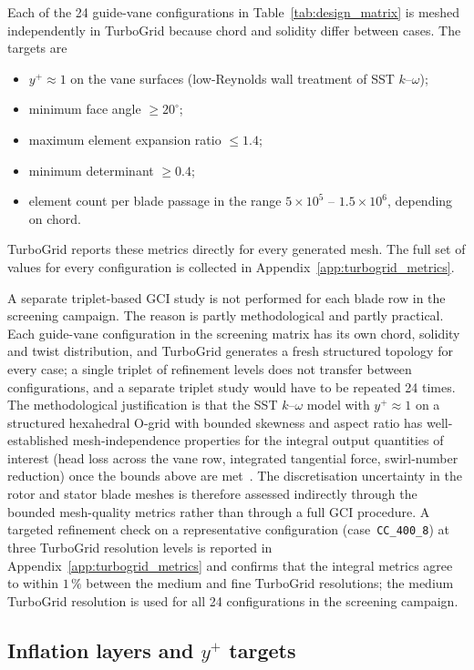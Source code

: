 Each of the 24 guide-vane configurations in Table~\ref{tab:design_matrix} is meshed independently in TurboGrid because chord and solidity differ between cases. The targets are
\begin{itemize}
  \item $y^+ \approx 1$ on the vane surfaces (low-Reynolds wall treatment of SST $k$--$\omega$);
  \item minimum face angle $\geq 20^\circ$;
  \item maximum element expansion ratio $\leq 1.4$;
  \item minimum determinant $\geq 0.4$;
  \item element count per blade passage in the range $5\times 10^5$ -- $1.5\times 10^6$, depending on chord.
\end{itemize}
TurboGrid reports these metrics directly for every generated mesh. The full set of values for every configuration is collected in Appendix~\ref{app:turbogrid_metrics}.

A separate triplet-based GCI study is not performed for each blade row in the screening campaign. The reason is partly methodological and partly practical. Each guide-vane configuration in the screening matrix has its own chord, solidity and twist distribution, and TurboGrid generates a fresh structured topology for every case; a single triplet of refinement levels does not transfer between configurations, and a separate triplet study would have to be repeated 24 times. The methodological justification is that the SST $k$--$\omega$ model with $y^+ \approx 1$ on a structured hexahedral O-grid with bounded skewness and aspect ratio has well-established mesh-independence properties for the integral output quantities of interest (head loss across the vane row, integrated tangential force, swirl-number reduction) once the bounds above are met~\cite{Menter1994}. The discretisation uncertainty in the rotor and stator blade meshes is therefore assessed indirectly through the bounded mesh-quality metrics rather than through a full GCI procedure. A targeted refinement check on a representative configuration (case~\texttt{CC\_400\_8}) at three TurboGrid resolution levels is reported in Appendix~\ref{app:turbogrid_metrics} and confirms that the integral metrics agree to within $1\,\%$ between the medium and fine TurboGrid resolutions; the medium TurboGrid resolution is used for all 24 configurations in the screening campaign.

\subsection{Inflation layers and $y^+$ targets}
\label{sec:methods_inflation}

